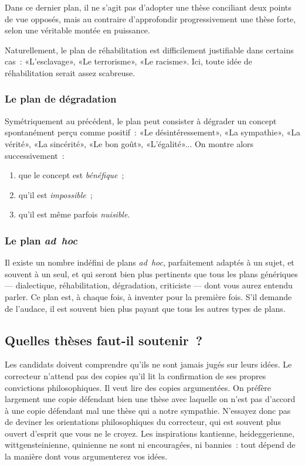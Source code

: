 \documentclass[a4paper,11pt]{article}
\begin{document}
\par

Dans ce dernier plan, il ne s'agit pas d'adopter une thèse conciliant
deux points de vue opposés, mais au contraire d'approfondir
progressivement une thèse forte, selon une véritable montée en
puissance. 

\par

Naturellement, le plan de réhabilitation est difficilement justifiable
dans certains cas~: «L'esclavage», «Le terrorisme», «Le racisme». Ici,
toute idée de réhabilitation serait assez scabreuse.


\subsubsection{Le plan de dégradation}

Symétriquement au précédent, le plan peut consister à dégrader un
concept spontanément perçu comme positif~: «Le désintéressement», «La
sympathie», «La vérité», «La sincérité», «Le bon goût»,
«L'égalité»... On montre alors successivement~:
\begin{enumerate}
\item que le concept est \emph{bénéfique}~;
\item qu'il est \emph{impossible}~;
\item qu'il est même parfois \emph{nuisible}.
\end{enumerate}





\subsubsection{Le plan \emph{ad~hoc}}

Il existe un nombre indéfini de plans \emph{ad~hoc}, parfaitement
adaptés à un sujet, et souvent à un seul, et qui seront bien plus
pertinents que tous les plans génériques --- dialectique,
réhabilitation, dégradation, criticiste --- dont vous aurez entendu
parler. Ce plan est, à chaque fois, à inventer pour la première
fois. S'il demande de l'audace, il est souvent bien plus payant que tous
les autres types de plans.


\subsection{Quelles thèses faut-il soutenir~?}

Les candidats doivent comprendre qu'ils ne sont jamais jugés sur leurs
idées. Le correcteur n'attend pas des copies qu'il lit la confirmation
de ses propres convictions philosophiques. Il veut lire des copies
argumentées. On préfère largement une copie défendant bien une thèse
avec laquelle on n'est pas d'accord à une copie défendant mal une thèse
qui a notre sympathie. N'essayez donc pas de deviner les orientations
philosophiques du correcteur, qui est souvent plus ouvert d'esprit que
vous ne le croyez. Les inspirations kantienne, heideggerienne,
wittgensteinienne, quinienne ne sont ni encouragées, ni bannies~: tout
dépend de la manière dont vous argumenterez vos idées.
\end{document}
